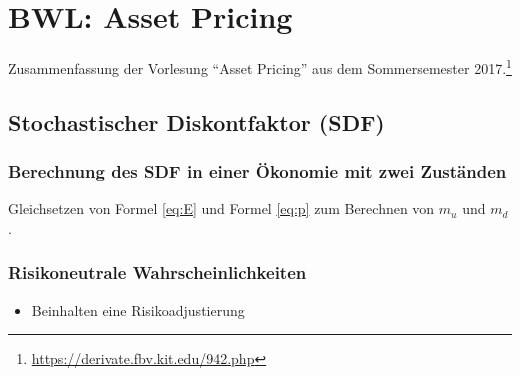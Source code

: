 \chapter{BWL: Asset Pricing}

Zusammenfassung der Vorlesung "`Asset Pricing"' aus dem Sommersemester 2017.\footnote{\url{https://derivate.fbv.kit.edu/942.php}}

\section{Stochastischer Diskontfaktor (SDF)}

\subsection{Berechnung des SDF in einer Ökonomie mit zwei Zuständen}
Gleichsetzen von Formel \ref{eq:E} und Formel \ref{eq:p} zum Berechnen von \(m_u\) und \(m_d\).


\subsection{Risikoneutrale Wahrscheinlichkeiten}
\begin{itemize}
	\item Beinhalten eine Risikoadjustierung
\end{itemize}



